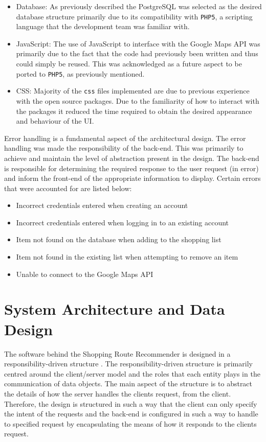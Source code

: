 \documentclass[10pt, a4paper, onecolumn]{scrartcl}
\begin{document}
		\begin{itemize}
			\item Database: As previously described the PostgreSQL was selected as the desired database structure primarily due to its compatibility with \texttt{PHP5}, a scripting language that the development team was familiar with.  
			\item JavaScript: The use of JavaScript to interface with the Google Maps API was primarily due to the fact that the code had previously been written and thus could simply be reused. This was acknowledged as a future aspect to be ported to \texttt{PHP5}, as previously mentioned.
			\item CSS: Majority of the \texttt{css} files implemented are due to previous experience with the open source packages. Due to the familiarity of how to interact with the packages it reduced the time required to obtain the desired appearance and behaviour of the UI.
		\end{itemize}
		
		Error handling is a fundamental aspect of the architectural design. The error handling was made the responsibility of the back-end. This was primarily to achieve and maintain the level of abstraction present in the design. The back-end is responsible for determining the required response to the user request (in error) and inform the front-end of the appropriate information to display. Certain errors that were accounted for are listed below:
		
		\begin{itemize}
			\item Incorrect credentials entered when creating an account
			\item Incorrect credentials entered when logging in to an existing account
			\item Item not found on the database when adding to the shopping list
			\item Item not found in the existing list when attempting to remove an item
			\item Unable to connect to the Google Maps API
		\end{itemize}

	\section{System Architecture and Data Design}
	
		The software behind the Shopping Route Recommender is designed in a responsibility-driven structure \cite{responsibility}. The responsibility-driven structure is primarily centred around the client/server model and the roles that each entity plays in the communication of data objects. The main aspect of the structure is to abstract the details of how the server handles the clients request, from the client. Therefore, the design is structured in such a way that the client can only specify the intent of the requests and the back-end is configured in such a way to handle to specified request by encapsulating the means of how it responds to the clients request.\\
		
\end{document}
